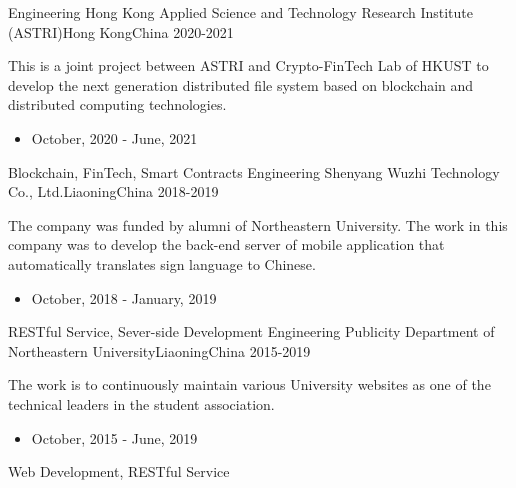 %
%
%
\begin{experiences}
  \experience
  {Engineering}   {Hong Kong Applied Science and Technology Research Institute (ASTRI)}{Hong Kong}{China}
  {2020-2021} {
    This is a joint project between ASTRI and Crypto-FinTech Lab of HKUST to develop the next generation distributed file system based on blockchain and distributed computing technologies.
    \begin{itemize}
      \item October, 2020 - June, 2021
    \end{itemize}
  }
  {Blockchain, FinTech, Smart Contracts}
  \emptySeparator
  \experience
  {Engineering} {Shenyang Wuzhi Technology Co., Ltd.}{Liaoning}{China}
  {2018-2019}    {
    The company was funded by alumni of Northeastern University. The work in this company was to develop the back-end server of mobile application that automatically translates sign language to Chinese.
    \begin{itemize}
      \item October, 2018 - January, 2019
    \end{itemize}
  }
  {RESTful Service, Sever-side Development}
  \emptySeparator
  \experience
  {Engineering} {Publicity Department of Northeastern University}{Liaoning}{China}
  {2015-2019}    {
    The work is to continuously maintain various University websites as one of the technical leaders in the student association.
    \begin{itemize}
      \item October, 2015 - June, 2019
    \end{itemize}
  }
  {Web Development, RESTful Service}
\end{experiences}
